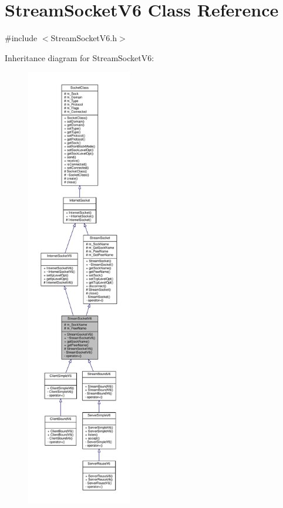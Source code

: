 \hypertarget{classStreamSocketV6}{}\section{Stream\+Socket\+V6 Class Reference}
\label{classStreamSocketV6}


{\ttfamily \#include $<$Stream\+Socket\+V6.\+h$>$}



Inheritance diagram for Stream\+Socket\+V6\+:\nopagebreak
\begin{figure}[H]
\begin{center}
\leavevmode
\includegraphics[height=550pt]{classStreamSocketV6__inherit__graph}
\end{center}
\end{figure}
